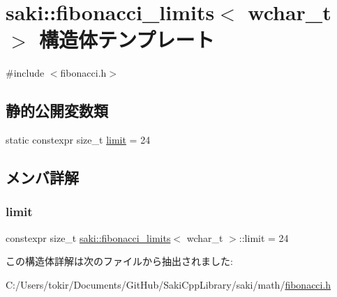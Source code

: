 \hypertarget{structsaki_1_1fibonacci__limits_3_01wchar__t_01_4}{}\section{saki\+:\+:fibonacci\+\_\+limits$<$ wchar\+\_\+t $>$ 構造体テンプレート}
\label{structsaki_1_1fibonacci__limits_3_01wchar__t_01_4}


{\ttfamily \#include $<$fibonacci.\+h$>$}

\subsection*{静的公開変数類}
\begin{DoxyCompactItemize}
\item 
static constexpr size\+\_\+t \mbox{\hyperlink{structsaki_1_1fibonacci__limits_3_01wchar__t_01_4_afb9aab4bc4b1b82b39d7e3d255ab0660}{limit}} = 24
\end{DoxyCompactItemize}


\subsection{メンバ詳解}
\mbox{\label{structsaki_1_1fibonacci__limits_3_01wchar__t_01_4_afb9aab4bc4b1b82b39d7e3d255ab0660}} 
\subsubsection{\texorpdfstring{limit}{limit}}
{\footnotesize\ttfamily constexpr size\+\_\+t \mbox{\hyperlink{structsaki_1_1fibonacci__limits}{saki\+::fibonacci\+\_\+limits}}$<$ wchar\+\_\+t $>$\+::limit = 24\hspace{0.3cm}{\ttfamily [static]}}



この構造体詳解は次のファイルから抽出されました\+:\begin{DoxyCompactItemize}
\item 
C\+:/\+Users/tokir/\+Documents/\+Git\+Hub/\+Saki\+Cpp\+Library/saki/math/\mbox{\hyperlink{fibonacci_8h}{fibonacci.\+h}}\end{DoxyCompactItemize}
